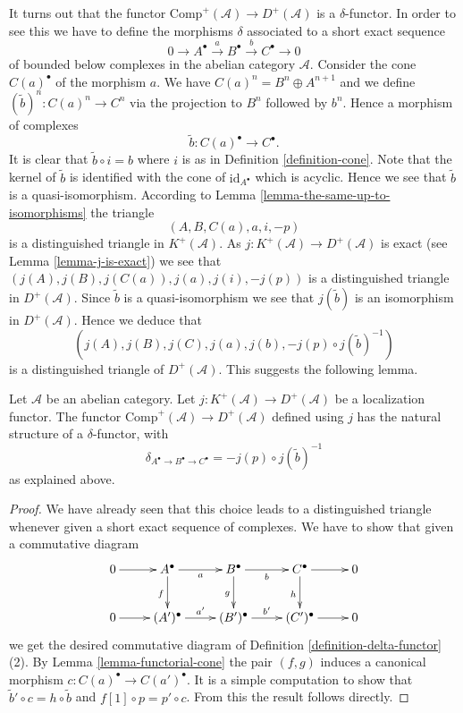 \medskip\noindent
It turns out that the functor
$\text{Comp}^{+}(\mathcal{A}) \to D^{+}(\mathcal{A})$ is a
$\delta$-functor. In order to see this we have to define
the morphisms $\delta$ associated to a short exact sequence
$$
0 \to A^\bullet \xrightarrow{a} B^\bullet \xrightarrow{b} C^\bullet \to 0
$$
of bounded below complexes in the abelian category $\mathcal{A}$.
Consider the cone $C(a)^\bullet$ of the morphism $a$.
We have $C(a)^n = B^n \oplus A^{n + 1}$ and we define
$(\tilde b)^n : C(a)^n \to C^n$ via the projection to $B^n$ followed
by $b ^n$. Hence a morphism of complexes
$$
\tilde b : C(a)^\bullet \longrightarrow C^\bullet.
$$
It is clear that $\tilde b \circ i = b$ where $i$ is as in
Definition \ref{definition-cone}.
Note that the kernel of $\tilde b$ is identified with
the cone of $\text{id}_{A^\bullet}$ which is acyclic.
Hence we see that $\tilde b$ is a quasi-isomorphism.
According to Lemma \ref{lemma-the-same-up-to-isomorphisms} the triangle
$$
(A, B, C(a), a, i, -p)
$$
is a distinguished triangle in $K^{+}(\mathcal{A})$.
As $j : K^{+}(\mathcal{A}) \to D^{+}(\mathcal{A})$ is
exact (see Lemma \ref{lemma-j-is-exact}) we see that
$(j(A), j(B), j(C(a)), j(a), j(i), -j(p))$ is a distinguished
triangle in $D^{+}(\mathcal{A})$. Since $\tilde b$ is a quasi-isomorphism
we see that $j(\tilde b)$ is an isomorphism in $D^{+}(\mathcal{A})$.
Hence we deduce that
$$
(j(A), j(B), j(C), j(a), j(b), -j(p) \circ j(\tilde b)^{-1})
$$
is a distinguished triangle of $D^{+}(\mathcal{A})$.
This suggests the following lemma.

\begin{lemma}
\label{lemma-canonical-delta-functor}
Let $\mathcal{A}$ be an abelian category.
Let $j : K^{+}(\mathcal{A}) \to D^{+}(\mathcal{A})$ be
a localization functor. The functor
$\text{Comp}^{+}(\mathcal{A}) \to D^{+}(\mathcal{A})$
defined using $j$ has the natural structure of a $\delta$-functor, with
$$
\delta_{A^\bullet \to B^\bullet \to C^\bullet} = -j(p) \circ j(\tilde b)^{-1}
$$
as explained above.
\end{lemma}

\begin{proof}
We have already seen that this choice leads to a distinguished
triangle whenever given a short exact sequence of complexes.
We have to show that given a commutative diagram
$$
\xymatrix{
0 \ar[r] &
A^\bullet \ar[r]_a \ar[d]_f &
B^\bullet \ar[r]_b \ar[d]_g &
C^\bullet \ar[r] \ar[d]_h &
0 \\
0 \ar[r] &
(A')^\bullet \ar[r]^{a'} &
(B')^\bullet \ar[r]^{b'} &
(C')^\bullet \ar[r] &
0
}
$$
we get the desired commutative diagram of
Definition \ref{definition-delta-functor} (2).
By Lemma \ref{lemma-functorial-cone}
the pair $(f, g)$ induces a canonical morphism
$c : C(a)^\bullet \to C(a')^\bullet$. It is a simple computation
to show that $\tilde b' \circ c = h \circ \tilde b$ and
$f[1] \circ p = p' \circ c$. From this the result follows directly.
\end{proof}

